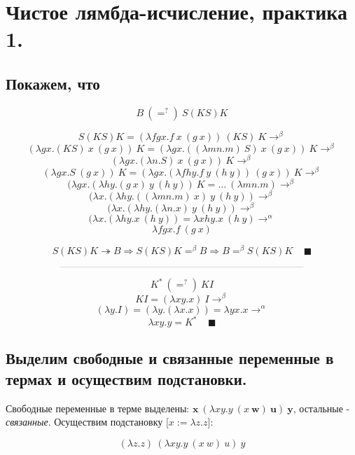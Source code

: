 \documentclass[a4paper,12pt]{article}
\date{ВШЭ ПМИ, 2022 г.}
\author{Алексей Косенко}
\theoremstyle{plain} %
\theoremstyle{definition} %
\theoremstyle{remark} %
\begin{document}
\maketitle
\section{Чистое лямбда-исчисление, практика 1.}
\subsection{Покажем, что}

$$B \ \left(=^{?}\right) \ S(KS)K$$

$$S(KS)K = (\lambda fgx.f \ x \ (g \ x) ) \ (KS) \ K \rightarrow^{\beta}$$
$$(\lambda gx.(KS) \ x \ (g \ x)) \ K = (\lambda gx.((\lambda m n. m) \ S) \ x \ (g \ x)) \ K \rightarrow^{\beta}$$
$$(\lambda gx.(\lambda n. S) \ x \ (g \ x)) \ K \rightarrow^{\beta}$$
$$(\lambda gx. S \ (g \ x)) \ K = (\lambda gx.  (\lambda f  h y. f  \ y \ (h \ y)) \ (g \ x)) \ K  \rightarrow^{\beta} $$
$$(\lambda gx.  (\lambda h y. (g \ x)  \ y \ (h \ y))  \ K  = \dots  \ (\lambda m n. m) \rightarrow^{\beta}$$
$$(\lambda x.  (\lambda h y. ((\lambda m n. m) \ x)  \ y \ (h \ y)) \rightarrow^{\beta}$$
$$(\lambda x.  (\lambda h y. (\lambda n. x)  \ y \ (h \ y)) \rightarrow^{\beta}$$
$$(\lambda x.  (\lambda h y. x \ (h \ y)) = \lambda xhy.x \ (h \ y) \rightarrow^{\alpha}$$
$$\lambda fgx.f \ (g \ x)$$

$$S(KS)K \twoheadrightarrow B \Rightarrow S(KS)K =^{\beta} B \Rightarrow B =^{\beta} S(KS)K \ \ \ \ \ \blacksquare $$

$$\rule{25em}{0.01em}$$

$$K^{*} \ \left(=^{?}\right) \ KI$$
$$KI = (\lambda x y. x) \ I \rightarrow^{\beta}$$
$$(\lambda y. I) = (\lambda y. (\lambda x. x)) = \lambda y x. x \rightarrow^{\alpha}$$
$$\lambda x y. y = K^* \ \ \ \ \ \blacksquare$$

\subsection{Выделим свободные и связанные переменные в термах и осуществим подстановки.}

Свободные переменные в терме выделены: $\boldsymbol{x} \ (\lambda x y. y \ (x \ \boldsymbol{w}) \ \boldsymbol{u}) \ \boldsymbol{y}$, остальные - \textit{связанные}. Осуществим подстановку [$x := \lambda z. z$]:

$$ (\lambda z. z) \ (\lambda x y. y \ (x \ w) \ u) \ y $$
\end{document}
